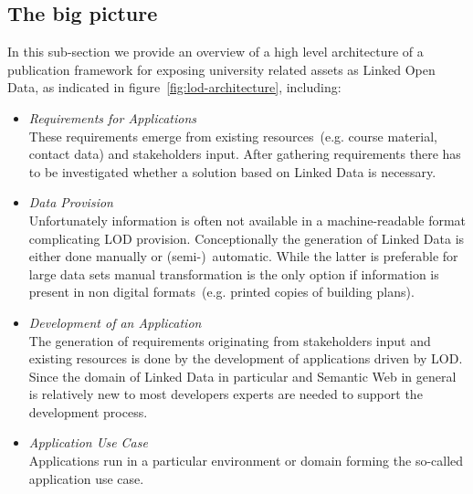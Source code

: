 \documentclass{article}
\begin{document}
\subsection{The big picture}
In this sub-section we provide an overview of a high level architecture of a publication framework for exposing university related assets as Linked Open Data, as indicated in figure~\ref{fig:lod-architecture}, including:
\begin{itemize}
  \item \textit{Requirements for Applications}~\\
  These requirements emerge from existing resources~(e.g. course material, contact data) and stakeholders input. After gathering requirements there has to be investigated whether a solution based on Linked Data is necessary.
  \item \textit{Data Provision}~\\
  Unfortunately information is often not available in a machine-readable format complicating LOD provision. Conceptionally the generation of Linked Data is either done manually or (semi-)~automatic. While the latter is preferable for large data sets manual transformation is the only option if information is present in non digital formats~(e.g. printed copies of building plans).  
  \item \textit{Development of an Application}~\\
  The generation of requirements originating from stakeholders input and existing resources is done by the development of applications driven by LOD. Since the domain of Linked Data in particular and Semantic Web in general is relatively new to most developers experts are needed to support the development process. 
  \item \textit{Application Use Case}~\\
  Applications run in a particular environment or domain forming the so-called application use case. 
\end{itemize}
\end{document}
